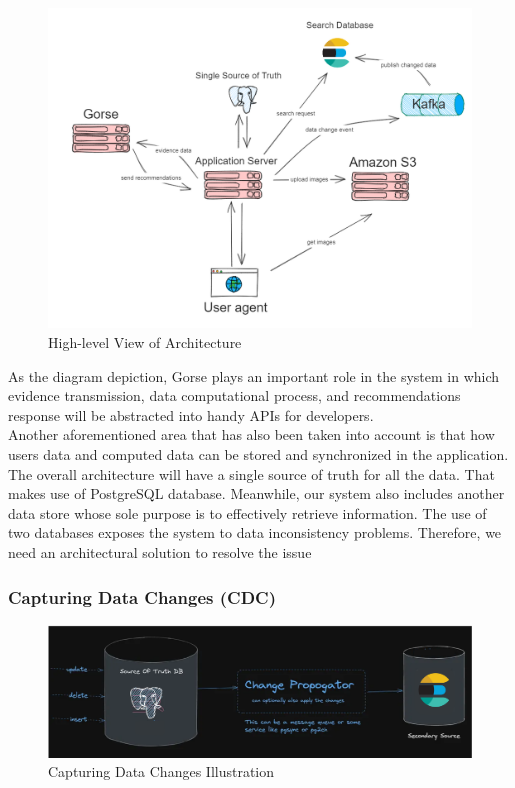 \begin{figure}[H]
    \centering
    \includegraphics[width=1\linewidth]{image/Architecture/high-level.png}
    \caption{High-level View of Architecture}
    \label{fig:enter-label}
\end{figure}

\noindent As the diagram depiction, Gorse plays an important role in the system in which evidence transmission, data computational process, and recommendations response will be abstracted into handy APIs for developers. \\

\noindent Another aforementioned area that has also been taken into account is that how users data and computed data can be stored and synchronized in the application.\\ 
The overall architecture will have a single source of truth for all the data. That makes use of PostgreSQL database. Meanwhile, our system also includes another data store whose sole purpose is to effectively retrieve information. The use of two databases exposes the system to data inconsistency problems. Therefore, we need an architectural solution to resolve the issue


\subsubsection{Capturing Data Changes (CDC)}

\begin{figure}[H]
    \centering
    \includegraphics[width=1\linewidth]{image/Architecture/cdc.png}
    \caption{Capturing Data Changes Illustration}
    \label{fig:enter-label}
\end{figure}


